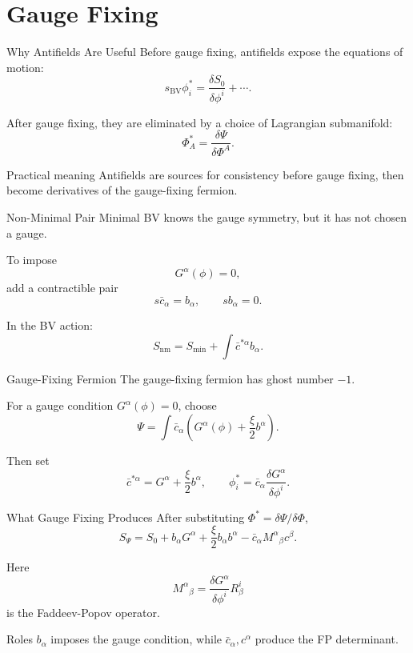\documentclass[aspectratio=169,professionalfonts]{beamer}
\begin{document}
\section{Gauge Fixing}

\begin{frame}{Why Antifields Are Useful}
  Before gauge fixing, antifields expose the equations of motion:
  \[
    s_{\mathrm{BV}}\phi_i^*
    =\frac{\delta S_0}{\delta\phi^i}+\cdots .
  \]

  After gauge fixing, they are eliminated by a choice of Lagrangian submanifold:
  \[
    \Phi_A^*=\frac{\delta\Psi}{\delta\Phi^A}.
  \]

  \begin{block}{Practical meaning}
    Antifields are sources for consistency before gauge fixing, then become
    derivatives of the gauge-fixing fermion.
  \end{block}
\end{frame}

\begin{frame}{Non-Minimal Pair}
  Minimal BV knows the gauge symmetry, but it has not chosen a gauge.

  To impose
  \[
    G^\alpha(\phi)=0,
  \]
  add a contractible pair
  \[
    s\bar c_\alpha=b_\alpha,
    \qquad
    sb_\alpha=0 .
  \]

  In the BV action:
  \[
    S_{\mathrm{nm}}=S_{\min}+\int \bar c^{*\alpha}b_\alpha .
  \]
\end{frame}

\begin{frame}{Gauge-Fixing Fermion}
  The gauge-fixing fermion has ghost number $-1$.

  For a gauge condition $G^\alpha(\phi)=0$, choose
  \[
    \Psi
    =\int \bar c_\alpha
    \left(G^\alpha(\phi)+\frac{\xi}{2}b^\alpha\right).
  \]

  Then set
  \[
    \bar c^{*\alpha}=G^\alpha+\frac{\xi}{2}b^\alpha,
    \qquad
    \phi_i^*=\bar c_\alpha\frac{\delta G^\alpha}{\delta\phi^i}.
  \]
\end{frame}

\begin{frame}{What Gauge Fixing Produces}
  After substituting $\Phi^*=\delta\Psi/\delta\Phi$,
  \[
    S_\Psi
    =S_0
    +b_\alpha G^\alpha
    +\frac{\xi}{2}b_\alpha b^\alpha
    -\bar c_\alpha M^\alpha{}_\beta c^\beta .
  \]

  Here
  \[
    M^\alpha{}_\beta
    =\frac{\delta G^\alpha}{\delta\phi^i}R^i_\beta
  \]
  is the Faddeev-Popov operator.

  \begin{block}{Roles}
    $b_\alpha$ imposes the gauge condition, while
    $\bar c_\alpha,c^\alpha$ produce the FP determinant.
  \end{block}
\end{frame}
\end{document}
